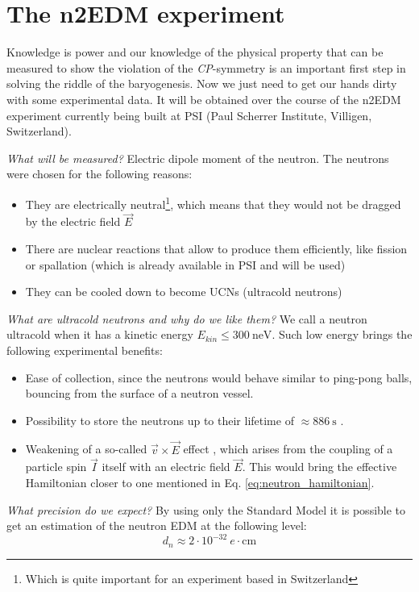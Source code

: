 \chapter{The n2EDM experiment}
\label{chapter:experiment}

Knowledge is power and our knowledge of the physical property that can be measured to show the violation of the \textit{CP}-symmetry is an important first step in solving the riddle of the baryogenesis. Now we just need to get our hands dirty with some experimental data. It will be obtained over the course of the n2EDM experiment currently being built at PSI (Paul Scherrer Institute, Villigen, Switzerland).

\textit{What will be measured?} Electric dipole moment of the neutron. The neutrons were chosen for the following reasons:
\begin{itemize}
	\item They are electrically neutral\footnote{Which is quite important for an experiment based in Switzerland}, which means that they would not be dragged by the electric field $\vec{E}$
	\item There are nuclear reactions that allow to produce them efficiently, like fission or spallation (which is already available in PSI and will be used)
	\item They can be cooled down to become UCNs (ultracold neutrons)
\end{itemize}

\textit{What are ultracold neutrons and why do we like them?} We call \cite{Fermi1936} a neutron ultracold when it has a kinetic energy $E_{kin} \leq 300\ \text{neV}$. Such low energy brings the following experimental benefits:
\begin{itemize}
	\item Ease of collection, since the neutrons would behave similar to ping-pong balls, bouncing from the surface of a neutron vessel.
	\item Possibility to store \cite{Zeldovich1959} the neutrons up to their lifetime of $\approx 886\ \text{s}$ \cite{Tanabashi2018}.
	\item Weakening of a so-called $\vec{v} \times \vec{E}$ effect \cite{Pendlebury2004}, which arises from the coupling of a particle spin $\vec{I}$ itself with an electric field $\vec{E}$. This would bring the effective Hamiltonian closer to one mentioned in Eq. \ref{eq:neutron_hamiltonian}.
\end{itemize}

\textit{What precision do we expect?} By using only the Standard Model it is possible to get an estimation \cite{Khriplovich1982} of the neutron EDM at the following level:
\begin{equation}
	d_n \approx 2 \cdot 10^{-32}\ e \cdot \text{cm}
\end{equation}

